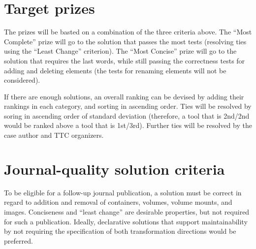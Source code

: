 \documentclass[sigconf,review]{acmart}
\begin{document}

\section{Target prizes}

The prizes will be basted on a combination of the three criteria above. The
``Most Complete'' prize will go to the solution that passes the most tests
(resolving ties using the ``Least Change'' criterion). The ``Most Concise''
prize will go to the solution that requires the last words, while still passing
the correctness tests for adding and deleting elements (the tests for renaming
elements will not be considered).

If there are enough solutions, an overall ranking can be devised by adding their
rankings in each category, and sorting in ascending order. Ties will be resolved
by soring in ascending order of standard deviation (therefore, a tool that is
2nd/2nd would be ranked above a tool that is 1st/3rd). Further ties will be
resolved by the case author and TTC organizers.

\section{Journal-quality solution criteria}

To be eligible for a follow-up journal publication, a solution must be correct
in regard to addition and removal of containers, volumes, volume mounts, and
images. Conciseness and ``least change'' are desirable properties, but not
required for such a publication. Ideally, declarative solutions that support
maintainability by not requiring the specification of both transformation
directions would be preferred.



\end{document}
